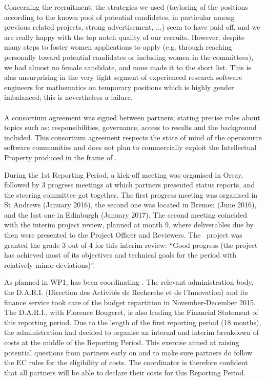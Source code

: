 \documentclass{deliverablereport}
\begin{document}
Concerning the recruitment: the strategies we used (tayloring of the
positions according to the known pool of potential candidates, in
particular among previous related projects, strong advertisement, ...)
seem to have paid off, and we are really happy with the top notch
quality of our recruits. However, despite many steps to foster women
applications to apply (e.g. through reaching personally toward
potential candidates or including women in the committees), we had
almost no female candidate, and none made it to the short list. This
is alas unsurprising in the very tight segment of experienced research
software engineers for mathematics on temporary positions which is
highly gender imbalanced; this is nevertheless a failure.

\paragraph{}

A consortium agreement was signed
between partners, stating precise rules about topics such as:
responsibilities, governance, access to results and the background
included.  This consortium agreement respects the state of mind of the opensource software communities and does not plan to commercially exploit the Intellectual Property produced in the frame of \ODK.

During the 1st Reporting Period, a kick-off meeting was organised in Orsay, followed by
3 progress meetings at which partners presented status reports, and
the steering committee got together.  The first progress meeting was
organised in St Andrews (January 2016), the second one was located
in Bremen (June 2016), and the last one in Edinburgh (January 2017). The second meeting coincided with the interim project
review, planned at month 9, where deliverables due by then were
presented to the Project Officer and Reviewers. The \ODK\ project was
granted the grade 3 out of 4 for this interim review: ``Good progress
(the project has achieved most of its objectives and technical goals
for the period with relatively minor deviations)''.

As planned in WP1,  has been coordinating \ODK.  The  relevant administration body, the D.A.R.I. (Direction des Activités de Recherche et de l'Innovation) and its finance service took care of the budget repartition in November-December 2015. The D.A.R.I., with Florence Bougeret, is also leading the Financial Statement of this reporting period. Due to the length of the first reporting period (18 months), the  administration had decided to organise an internal and interim
breakdown of costs at the middle of the Reporting Period. This exercise aimed at raising potential questions
from partners early on and to make sure partners do follow the EC
rules for the eligibility of costs. The coordinator is therefore confident that all partners will be able to declare their costs for this Reporting Period.
\end{document}
